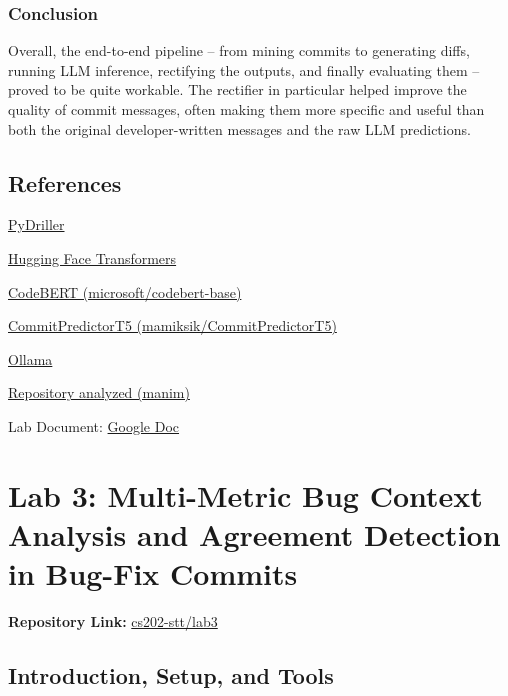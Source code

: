 \documentclass[10pt,a4paper]{report}
\begin{document}
\subsection{Conclusion}
Overall, the end-to-end pipeline -- from mining commits to generating diffs, running LLM inference, rectifying the outputs, and finally evaluating them -- proved to be quite workable. The rectifier in particular helped improve the quality of commit messages, often making them more specific and useful than both the original developer-written messages and the raw LLM predictions.


\section{References}
\begin{enumerate}[label={[\arabic*]}, itemsep=0.05em, topsep=0pt]
    \item \href{https://pydriller.readthedocs.io}{PyDriller}
    \item \href{https://huggingface.co/docs/transformers}{Hugging Face Transformers}
    \item \href{https://huggingface.co/microsoft/codebert-base}{CodeBERT (microsoft/codebert-base)}
    \item \href{https://huggingface.co/mamiksik/CommitPredictorT5}{CommitPredictorT5 (mamiksik/CommitPredictorT5)}
    \item \href{https://ollama.ai}{Ollama}
    \item \href{https://github.com/3b1b/manim}{Repository analyzed (manim)}
    \item Lab Document: \href{https://drive.google.com/file/d/1L4pCGQCekeELjgOJ4HxQ-Tso0QaOKIDf/view}{Google Doc}
\end{enumerate}













\chapter{Lab 3: Multi-Metric Bug Context Analysis and Agreement Detection in Bug-Fix Commits}

\textbf{Repository Link:} \href{https://github.com/ShardulJunagade/cs202-stt/tree/main/lab3}{cs202-stt/lab3}

\section{Introduction, Setup, and Tools}
\end{document}

